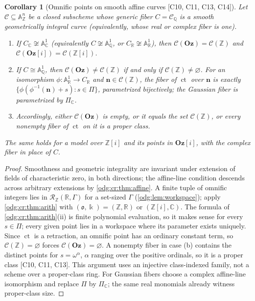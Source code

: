 \documentclass[11pt,oneside]{article}
\numberwithin{equation}{section}
\newtheorem{corollary}[corollary]{Corollary}
\theoremstyle{definition}
\theoremstyle{remark}
\newcommand{\Oz}{\mathbf{Oz}}
\newcommand{\Z}{\mathbb Z}
\newcommand{\Q}{\mathbb Q}
\newcommand{\R}{\mathbb R}
\newcommand{\C}{\mathbb C}
\newcommand{\ct}{\operatorname{ct}}
\newcommand{\src}[1]{\textup{\textsf{\small[#1]}}}
\newcommand{\Og}{\Oz[i]}
\newcommand{\Aff}{\mathbb A}
\begin{document}
\begin{corollary}[Omnific points on smooth affine curves \src{C10, C11, C13, C14}]\label{odg:cr:cor:omnific}
Let $\mathcal C\subseteq\Aff^n_\Z$ be a closed subscheme whose generic
fiber $C=\mathcal C_\Q$ is a smooth geometrically integral curve (equivalently, whose
real or complex fiber is one).
\begin{enumerate}[label=\textup{(\alph*)},leftmargin=*]
\item If $C_\C\not\cong\Aff^1_\C$ (equivalently $C\not\cong\Aff^1_\Q$, or
$C_\R\not\cong\Aff^1_\R$), then $\mathcal C(\Oz)=\mathcal C(\Z)$ and
$\mathcal C(\Og)=\mathcal C(\Z[i])$.
\item If $C\cong\Aff^1_\Q$, then $\mathcal C(\Oz)\ne\mathcal C(\Z)$ if and only if
$\mathcal C(\Z)\ne\varnothing$. For an isomorphism $\phi:\Aff^1_\R\to C_\R$ and
$\mathbf n\in\mathcal C(\Z)$, the fiber of $\ct$ over $\mathbf n$ is exactly
$\{\phi(\phi^{-1}(\mathbf n)+s):s\in\Pi\}$, parametrized bijectively; the Gaussian
fiber is parametrized by $\Pi_\C$.
\item Accordingly, either $\mathcal C(\Oz)$ is empty, or it equals the set
$\mathcal C(\Z)$, or every nonempty fiber of $\ct$ on it is a proper class.
\end{enumerate}
The same holds for a model over $\Z[i]$ and its points in $\Og$, with the complex
fiber in place of $C$.
\end{corollary}
\begin{proof}
Smoothness and geometric integrality are invariant under extension of fields of
characteristic zero, in both directions; the affine-line condition descends
across arbitrary extensions by \cref{odg:cr:thm:affine}.
A finite tuple of omnific integers lies in
$\mathcal R_\Z(\R,\Gamma)$ for a set-sized $\Gamma$ (\cref{odg:lem:workspace}); apply
\cref{odg:cr:thm:arith} with $(\mathfrak o,\Bbbk)=(\Z,\R)$ or $(\Z[i],\C)$. The
formula of \cref{odg:cr:thm:arith}(ii) is finite polynomial evaluation, so it makes
sense for every $s\in\Pi$; every given point lies in a workspace where its
parameter exists uniquely. Since $\ct$ is a retraction, an omnific point has an
ordinary constant term, so $\mathcal C(\Z)=\varnothing$ forces
$\mathcal C(\Oz)=\varnothing$. A nonempty fiber in case (b) contains the distinct
points for $s=\omega^\alpha$, $\alpha$ ranging over the positive ordinals, so it is a
proper class \src{C10, C11, C13}. This argument uses an injective class-indexed
family, not a scheme over a proper-class ring. For Gaussian fibers choose a
complex affine-line isomorphism and replace $\Pi$ by $\Pi_\C$; the same real
monomials already witness proper-class size.
\end{proof}
\end{document}
